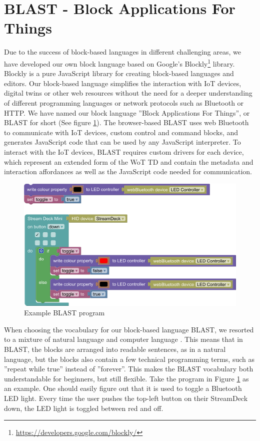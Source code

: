 \documentclass[runningheads]{llncs}
\begin{document}
\section{BLAST - Block Applications For Things}
Due to the success of block-based languages in different challenging areas, we have developed our own block language based on Google's Blockly\footnote{\url{https://developers.google.com/blockly/}} library. %
Blockly is a pure JavaScript library for creating block-based languages and editors.
Our block-based language simplifies the interaction with IoT devices, digital twins or other web resources without the need for a deeper understanding of different programming languages or network protocols such as Bluetooth or HTTP.
We have named our block language ''Block Applications For Things'', or BLAST for short (See figure \ref{fig1}).
The browser-based BLAST uses web Bluetooth to communicate with IoT devices, custom control and command blocks, and generates JavaScript code that can be used by any JavaScript interpreter.
To interact with the IoT devices, BLAST requires custom drivers for each device, which represent an extended form of the WoT TD %
 and contain the metadata and interaction affordances as well as the JavaScript code needed for communication.

\begin{figure}
\includegraphics[width=\textwidth]{screenshot.png}%
\caption{Example BLAST program} \label{fig1}
\end{figure}

When choosing the vocabulary for our block-based language BLAST, we resorted to a mixture of natural language and computer language \cite{8120404}.
This means that in BLAST, the blocks are arranged into readable sentences, as in a natural language, but the blocks also contain a few technical programming terms, such as ''repeat while true'' instead of ''forever''.
This makes the BLAST vocabulary both understandable for beginners, but still flexible. Take the program in Figure \ref{fig1} as an example. One should easily figure out that it is used to toggle a Bluetooth LED light. Every time the user pushes the top-left button on their StreamDeck down, the LED light is toggled between red and off.
\end{document}
